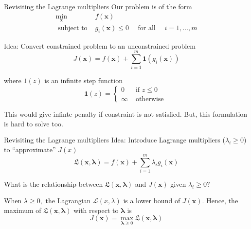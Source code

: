 \documentclass[xcolor=table]{beamer}
\begin{document}
            \begin{frame}{Revisiting the Lagrange multipliers}
                Our problem is of the form \\
               $$ \begin{array}{cl}
                    \min _{\boldsymbol{x}} & f(\boldsymbol{x}) \\
                    \text { subject to } & g_{i}(\boldsymbol{x}) \leqslant 0 \quad \text { for all } \quad i=1, \ldots, m
                    \end{array}$$

                    \pause Idea: Convert constrained problem to an unconstrained problem
                    $$J(\boldsymbol{x})=f(\boldsymbol{x})+\sum_{i=1}^{m} \mathbf{1}\left(g_{i}(\boldsymbol{x})\right)$$

                  \pause   where $1(z)$ is an infinite step function
\[
\mathbf{1}(z)=\left\{\begin{array}{ll}
0 & \text { if } z \leqslant 0 \\
\infty & \text { otherwise }
\end{array}\right.
\]

\pause This would give infinte penalty if constraint is not satisfied. But, this formulation is hard to solve too.
\end{frame}

\begin{frame}{Revisiting the Lagrange multipliers}
    Idea: Introduce Lagrange multipliers ($\lambda_i \geq 0$) to ``approximate'' $J(x)$
    $$\mathfrak{L}(\boldsymbol{x}, \boldsymbol{\lambda})=f(\boldsymbol{x})+\sum_{i=1}^{m} \lambda_{i} g_{i}(\boldsymbol{x})$$
    
    \pause What is the relationship between $\mathfrak{L}(\boldsymbol{x}, \boldsymbol{\lambda})$ and $J(\boldsymbol{x})$ given $\lambda_i \geq 0$?

    \pause When $\lambda \geqslant 0,$ the Lagrangian $\mathcal{L}(x, \lambda)$ is a lower bound of $J(\boldsymbol{x}) .$ Hence, the maximum of $\mathfrak{L}(\boldsymbol{x}, \boldsymbol{\lambda})$ with respect to $\boldsymbol{\lambda}$ is
    \[
    J(\boldsymbol{x})=\max _{\boldsymbol{\lambda} \geqslant 0} \mathfrak{L}(\boldsymbol{x}, \boldsymbol{\lambda})
    \]

\end{frame}
\end{document}
